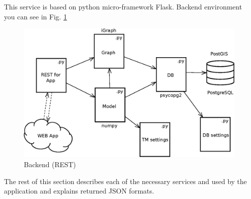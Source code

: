 This service is based on python micro-framework Flask. Backend environment you can see in Fig. \ref{img.asas}
\begin{figure}
\centering
\includegraphics[width=15cm]{img/c01-transp-model/backend.eps}
\caption{Backend (REST)}
\label{img.asas}
\end{figure}


The rest of this section describes each of the necessary services and used by the application and explains returned JSON formats.

